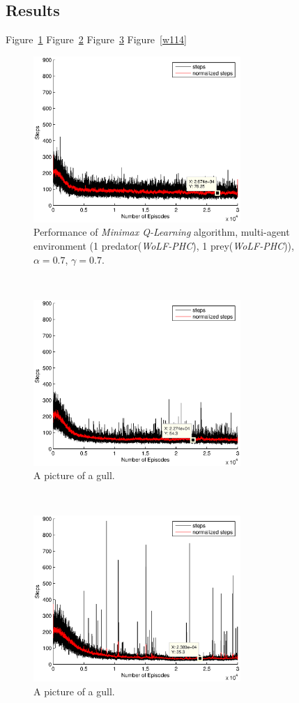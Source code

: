 \documentclass[a4paper,11pt]{article}
\begin{document}
\subsection{Results}
Figure~\ref{w111}
Figure~\ref{w112}
Figure~\ref{w113}
Figure~\ref{w114}
\begin{figure}[ht!]
  \centering
    \includegraphics[width=0.7\textwidth]{figures/w07070502.eps}
    \caption{Performance of  \textit{Minimax Q-Learning} algorithm, multi-agent environment (1 predator(\textit{WoLF-PHC}), 1 prey(\textit{WoLF-PHC})), $\alpha = 0.7$, $\gamma = 0.7$.}
    \label{w111}
\end{figure}
~
\begin{figure}[ht!]
  \centering
    \includegraphics[width=0.7\textwidth]{figures/w070703015.eps}
        \caption{A picture of a gull.}
    \label{w112}
\end{figure}
~
\begin{figure}[ht!]
  \centering
    \includegraphics[width=0.7\textwidth]{figures/w0707015005.eps}
        \caption{A picture of a gull.}
    \label{w113}
\end{figure}
\end{document}
